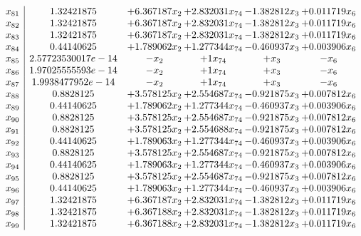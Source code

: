 \documentclass[11pt]{article}
\begin{document}
\[\begin{array}{c| c c@{\hskip 2pt} c@{\hskip 2pt} c@{\hskip 2pt} c@{\hskip 2pt} }
 x_{81}   &  1.32421875 & + 6.367187 x_{2} & + 2.832031 x_{74} & -1.382812 x_{3} & + 0.011719 x_{6}\\
 x_{82}   &  1.32421875 & + 6.367187 x_{2} & + 2.832031 x_{74} & -1.382812 x_{3} & + 0.011719 x_{6}\\
 x_{83}   &  1.32421875 & + 6.367187 x_{2} & + 2.832031 x_{74} & -1.382812 x_{3} & + 0.011719 x_{6}\\
 x_{84}   &  0.44140625 & + 1.789062 x_{2} & + 1.277344 x_{74} & -0.460937 x_{3} & + 0.003906 x_{6}\\
 x_{85}   &  2.57723530017e-14 & - x_{2} & + 1 x_{74} & +  x_{3} & - x_{6}\\
 x_{86}   &  1.97025555593e-14 & - x_{2} & + 1 x_{74} & +  x_{3} & - x_{6}\\
 x_{87}   &  1.9938477952e-14 & - x_{2} & + 1 x_{74} & +  x_{3} & - x_{6}\\
 x_{88}   &  0.8828125 & + 3.578125 x_{2} & + 2.554687 x_{74} & -0.921875 x_{3} & + 0.007812 x_{6}\\
 x_{89}   &  0.44140625 & + 1.789062 x_{2} & + 1.277344 x_{74} & -0.460937 x_{3} & + 0.003906 x_{6}\\
 x_{90}   &  0.8828125 & + 3.578125 x_{2} & + 2.554687 x_{74} & -0.921875 x_{3} & + 0.007812 x_{6}\\
 x_{91}   &  0.8828125 & + 3.578125 x_{2} & + 2.554688 x_{74} & -0.921875 x_{3} & + 0.007812 x_{6}\\
 x_{92}   &  0.44140625 & + 1.789063 x_{2} & + 1.277344 x_{74} & -0.460937 x_{3} & + 0.003906 x_{6}\\
 x_{93}   &  0.8828125 & + 3.578125 x_{2} & + 2.554687 x_{74} & -0.921875 x_{3} & + 0.007812 x_{6}\\
 x_{94}   &  0.44140625 & + 1.789063 x_{2} & + 1.277344 x_{74} & -0.460937 x_{3} & + 0.003906 x_{6}\\
 x_{95}   &  0.8828125 & + 3.578125 x_{2} & + 2.554687 x_{74} & -0.921875 x_{3} & + 0.007812 x_{6}\\
 x_{96}   &  0.44140625 & + 1.789063 x_{2} & + 1.277344 x_{74} & -0.460937 x_{3} & + 0.003906 x_{6}\\
 x_{97}   &  1.32421875 & + 6.367187 x_{2} & + 2.832031 x_{74} & -1.382812 x_{3} & + 0.011719 x_{6}\\
 x_{98}   &  1.32421875 & + 6.367188 x_{2} & + 2.832031 x_{74} & -1.382812 x_{3} & + 0.011719 x_{6}\\
 x_{99}   &  1.32421875 & + 6.367188 x_{2} & + 2.832031 x_{74} & -1.382812 x_{3} & + 0.011719 x_{6}\\

\end{array}\]
\end{document}
